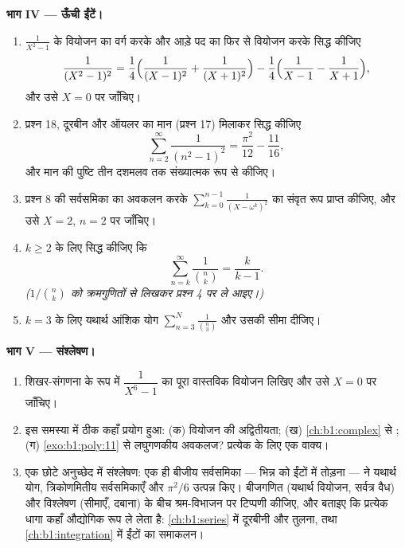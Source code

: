 \begin{problem}
\medskip \noindent\textbf{भाग IV --- ऊँची ईंटें।}
\begin{enumerate}[resume]
  \item $\frac1{X^2-1}$ के वियोजन का वर्ग करके और आड़े पद का फिर से वियोजन
  करके सिद्ध कीजिए
        \[
        \frac1{(X^2-1)^2}
        = \frac14\Bigl(\frac1{(X-1)^2} + \frac1{(X+1)^2}\Bigr)
        - \frac14\Bigl(\frac1{X-1} - \frac1{X+1}\Bigr),
        \]
        और उसे $X = 0$ पर जाँचिए।
  \item प्रश्न 18, दूरबीन और ऑयलर का मान (प्रश्न 17) मिलाकर सिद्ध कीजिए
        \[
        \sum_{n=2}^{\infty}\frac1{(n^2-1)^2}
        = \frac{\pi^2}{12} - \frac{11}{16} ,
        \]
        और मान की पुष्टि तीन दशमलव तक संख्यात्मक रूप से कीजिए।
  \item प्रश्न 8 की सर्वसमिका का अवकलन करके $\sum_{k=0}^{n-1}\frac1{(X -
  \omega^k)^2}$ का संवृत रूप प्राप्त कीजिए, और उसे $X = 2$, $n = 2$ पर
  जाँचिए।
  \item $k \geq 2$ के लिए सिद्ध कीजिए कि
        \[
        \sum_{n=k}^{\infty}\frac{1}{\binom nk} = \frac{k}{k-1} .
        \]
        \emph{($1/\binom nk$ को क्रमगुणितों से लिखकर प्रश्न 4 पर ले आइए।)}
  \item $k = 3$ के लिए यथार्थ आंशिक योग $\sum_{n=3}^{N}\frac1{\binom n3}$ और
  उसकी सीमा दीजिए।
\end{enumerate}

\medskip \noindent\textbf{भाग V --- संश्लेषण।}
\begin{enumerate}[resume]
  \item शिखर-संगणना के रूप में $\dfrac1{X^6 - 1}$ का पूरा वास्तविक वियोजन
  लिखिए और उसे $X = 0$ पर जाँचिए।
  \item इस समस्या में ठीक कहाँ प्रयोग हुआ: (क) वियोजन की अद्वितीयता; (ख)
  \cref{ch:b1:complex} से ; (ग) \cref{exo:b1:poly:11} से लघुगणकीय
  अवकलज? प्रत्येक के लिए एक वाक्य।
  \item एक छोटे अनुच्छेद में संश्लेषण: एक ही बीजीय सर्वसमिका --- भिन्न को
  ईंटों में तोड़ना --- ने यथार्थ योग, त्रिकोणमितीय सर्वसमिकाएँ और $\pi^2/6$
  उत्पन्न किए। बीजगणित (यथार्थ वियोजन, सर्वत्र वैध) और विश्लेषण (सीमाएँ,
  दबाना) के बीच श्रम-विभाजन पर टिप्पणी कीजिए, और बताइए कि प्रत्येक धागा कहाँ
  औद्योगिक रूप ले लेता है: \cref{ch:b1:series} में दूरबीनी और तुलना, तथा
  \cref{ch:b1:integration} में ईंटों का समाकलन।
\end{enumerate}
\end{problem}
